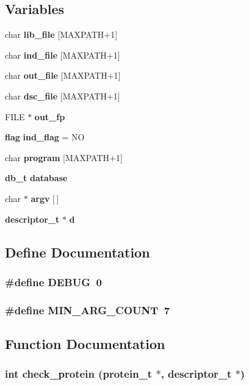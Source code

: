 \subsection*{Variables}
\begin{CompactItemize}
\item 
char {\bf lib\_\-file} [MAXPATH+1]
\item 
char {\bf ind\_\-file} [MAXPATH+1]
\item 
char {\bf out\_\-file} [MAXPATH+1]
\item 
char {\bf dsc\_\-file} [MAXPATH+1]
\item 
FILE $\ast$ {\bf out\_\-fp}
\item 
{\bf flag} {\bf ind\_\-flag} = NO
\item 
char {\bf program} [MAXPATH+1]
\item 
{\bf db\_\-t} {\bf database}
\item 
char $\ast$ {\bf argv} [$\,$]
\item 
{\bf descriptor\_\-t} $\ast$ {\bf d}
\end{CompactItemize}


\subsection{Define Documentation}
\subsubsection{\setlength{\rightskip}{0pt plus 5cm}\#define DEBUG\ 0}\label{Pilar__6_8c_a1}


\subsubsection{\setlength{\rightskip}{0pt plus 5cm}\#define MIN\_\-ARG\_\-COUNT\ 7}\label{Pilar__6_8c_a0}




\subsection{Function Documentation}
\subsubsection{\setlength{\rightskip}{0pt plus 5cm}int check\_\-protein ({\bf protein\_\-t} $\ast$, {\bf descriptor\_\-t} $\ast$)}\label{Pilar__6_8c_a16}


